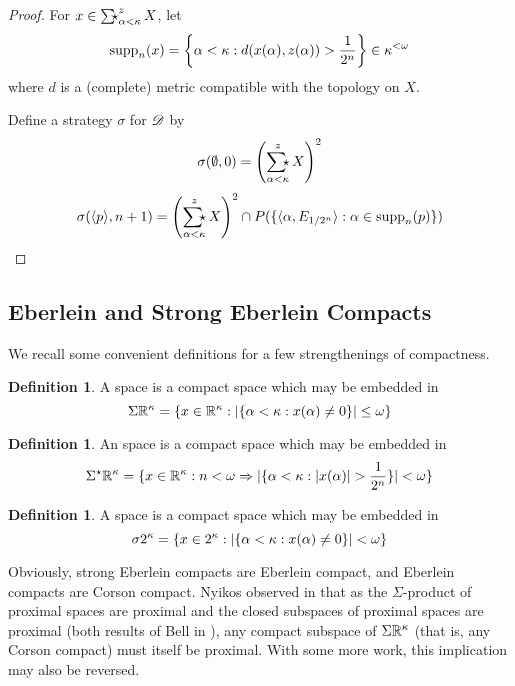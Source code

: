 \documentclass{amsart}
\theoremstyle{definition}
\newtheorem{definition}[theorem]{Definition}
\begin{document}
  \begin{proof}
    For \(x\in\SigmaStarProd_{\alpha<\kappa}^z X\), let
      \[
        \textrm{supp}_n(x)
          =
        \left\{
          \alpha<\kappa
        :
          d(x(\alpha),z(\alpha))>\frac{1}{2^n}
        \right\}
          \in
        \kappa^{<\omega}
      \]
    where \(d\) is a (complete) metric compatible with the topology on \(X\).

    Define a strategy \(\sigma\) for \(\mathscr{D}\) by
      \[
        \sigma(\emptyset,0)
          =
        \left(\SigmaStarProd_{\alpha<\kappa}^z X\right)^2
      \]
      \[
        \sigma(\<p\>,n+1)
          =
        \left(\SigmaStarProd_{\alpha<\kappa}^z X\right)^2
          \cap
        P(\{
          \<\alpha,E_{1/2^n}\>
            :
          \alpha\in\supp_n(p)
        \})
      \]
  \end{proof}

\subsection{Eberlein and Strong Eberlein Compacts}

  We recall some convenient definitions for a few strengthenings of
  compactness.

  \begin{definition}
    A  space is a compact space which may be embedded in
    \[
      \Sigma\mathbb{R}^{\kappa}
        =
      \{
        x\in \mathbb{R}^\kappa
      :
        |\{\alpha<\kappa:x(\alpha)\not=0\}|\leq\omega
      \}
    \]
  \end{definition}

  \begin{definition}
    An  space is a compact space which may be embedded in
    \[
      \SigmaStarProdR\kappa
        =
      \{
        x\in \mb R^\kappa
      :
        n<\omega
          \Rightarrow
        |\{\alpha<\kappa:|x(\alpha)|>\frac{1}{2^n}\}|<\omega
      \}
    \]
  \end{definition}

  \begin{definition}
    A  space is a compact space which may
    be embedded in
    \[
      \sigma2^{\kappa}
        =
      \{
        x\in 2^\kappa
      :
        |\{\alpha<\kappa:x(\alpha)\not=0\}|<\omega
      \}
    \]
  \end{definition}

  Obviously, strong Eberlein compacts are Eberlein compact, and Eberlein
  compacts are Corson compact. Nyikos observed in
  \cite{MR3288115} that as the \(\Sigma\)-product of proximal spaces
  are proximal and the closed subspaces of proximal spaces are proximal (both
  results of Bell in \cite{MR3239205}),
  any compact subspace of \(\Sigma\mathbb{R}^{\kappa}\) (that is, any Corson compact)
  must itself be proximal. With some more work, this implication may also
  be reversed.
\end{document}
